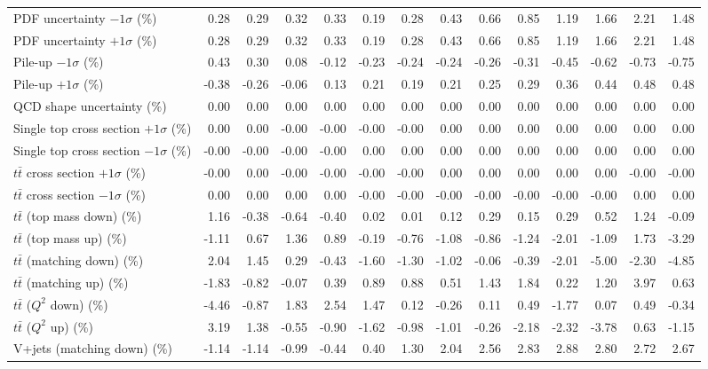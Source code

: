 \begin{table}[htbp]
{\begin{tabular}{lrrrrrrrrrrrrr}
PDF uncertainty $-1\sigma$ (\%) & 0.28 & 0.29 & 0.32 & 0.33 & 0.19 & 0.28 & 0.43 & 0.66 & 0.85 & 1.19 & 1.66 & 2.21 & 1.48 \\ 
PDF uncertainty $+1\sigma$ (\%) & 0.28 & 0.29 & 0.32 & 0.33 & 0.19 & 0.28 & 0.43 & 0.66 & 0.85 & 1.19 & 1.66 & 2.21 & 1.48 \\ 
Pile-up $-1\sigma$ (\%) & 0.43 & 0.30 & 0.08 & -0.12 & -0.23 & -0.24 & -0.24 & -0.26 & -0.31 & -0.45 & -0.62 & -0.73 & -0.75 \\ 
Pile-up $+1\sigma$ (\%) & -0.38 & -0.26 & -0.06 & 0.13 & 0.21 & 0.19 & 0.21 & 0.25 & 0.29 & 0.36 & 0.44 & 0.48 & 0.48 \\ 
QCD shape uncertainty (\%) & 0.00 & 0.00 & 0.00 & 0.00 & 0.00 & 0.00 & 0.00 & 0.00 & 0.00 & 0.00 & 0.00 & 0.00 & 0.00 \\ 
Single top cross section $+1\sigma$ (\%) & 0.00 & 0.00 & -0.00 & -0.00 & -0.00 & -0.00 & 0.00 & 0.00 & 0.00 & 0.00 & 0.00 & 0.00 & 0.00 \\ 
Single top cross section $-1\sigma$ (\%) & -0.00 & -0.00 & -0.00 & -0.00 & 0.00 & 0.00 & 0.00 & 0.00 & 0.00 & 0.00 & 0.00 & 0.00 & 0.00 \\ 
$t\bar{t}$ cross section $+1\sigma$ (\%) & -0.00 & 0.00 & -0.00 & -0.00 & -0.00 & -0.00 & 0.00 & 0.00 & 0.00 & 0.00 & 0.00 & -0.00 & -0.00 \\ 
$t\bar{t}$ cross section $-1\sigma$ (\%) & 0.00 & 0.00 & 0.00 & 0.00 & -0.00 & -0.00 & -0.00 & -0.00 & -0.00 & -0.00 & -0.00 & 0.00 & 0.00 \\ 
$t\bar{t}$ (top mass down) (\%) & 1.16 & -0.38 & -0.64 & -0.40 & 0.02 & 0.01 & 0.12 & 0.29 & 0.15 & 0.29 & 0.52 & 1.24 & -0.09 \\ 
$t\bar{t}$ (top mass up) (\%) & -1.11 & 0.67 & 1.36 & 0.89 & -0.19 & -0.76 & -1.08 & -0.86 & -1.24 & -2.01 & -1.09 & 1.73 & -3.29 \\ 
$t\bar{t}$ (matching down) (\%) & 2.04 & 1.45 & 0.29 & -0.43 & -1.60 & -1.30 & -1.02 & -0.06 & -0.39 & -2.01 & -5.00 & -2.30 & -4.85 \\ 
$t\bar{t}$ (matching up) (\%) & -1.83 & -0.82 & -0.07 & 0.39 & 0.89 & 0.88 & 0.51 & 1.43 & 1.84 & 0.22 & 1.20 & 3.97 & 0.63 \\ 
$t\bar{t}$ ($Q^{2}$ down) (\%) & -4.46 & -0.87 & 1.83 & 2.54 & 1.47 & 0.12 & -0.26 & 0.11 & 0.49 & -1.77 & 0.07 & 0.49 & -0.34 \\ 
$t\bar{t}$ ($Q^{2}$ up) (\%) & 3.19 & 1.38 & -0.55 & -0.90 & -1.62 & -0.98 & -1.01 & -0.26 & -2.18 & -2.32 & -3.78 & 0.63 & -1.15 \\ 
V+jets (matching down) (\%) & -1.14 & -1.14 & -0.99 & -0.44 & 0.40 & 1.30 & 2.04 & 2.56 & 2.83 & 2.88 & 2.80 & 2.72 & 2.67 \\ 

\end{tabular}}
\end{table}
